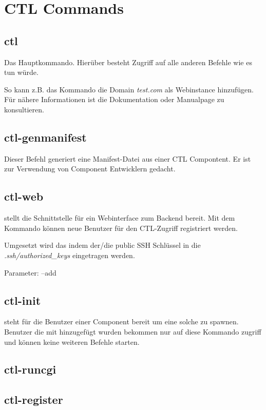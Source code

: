 \section{CTL Commands}

\subsection{ctl}
Das Hauptkommando. Hierüber besteht Zugriff auf alle anderen Befehle wie
 es tun würde.

So kann z.B. das Kommando  die
Domain \emph{test.com} als Webinstance hinzufügen.
Für nähere Informationen ist
die Dokumentation oder Manualpage zu konsultieren.


\subsection{ctl-genmanifest}

Dieser Befehl generiert eine Manifest-Datei aus einer CTL Compontent. Er ist zur
Verwendung von Component Entwicklern gedacht.


\subsection{ctl-web}

 stellt die Schnittstelle für ein
Webinterface zum Backend bereit. Mit dem Kommando können neue Benutzer für den
CTL-Zugriff registriert werden.

Umgesetzt wird das indem der/die public SSH Schlüssel in die
\emph{.ssh/authorized_keys} eingetragen werden.

Parameter:
--add 


\subsection{ctl-init}

 steht für die Benutzer einer Component
bereit um eine solche zu spawnen. Benutzer die mit
 hinzugefügt wurden bekommen nur auf diese
Kommando zugriff und können keine weiteren Befehle starten.


\subsection{ctl-runcgi}




\subsection{ctl-register}
